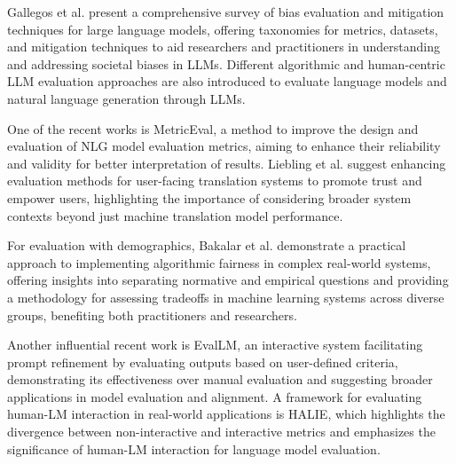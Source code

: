 Gallegos et al.\cite{Wasi2024BengaliBiases} present a comprehensive survey of bias evaluation and mitigation techniques for large language models, offering taxonomies for metrics, datasets, and mitigation techniques to aid researchers and practitioners in understanding and addressing societal biases in LLMs. Different algorithmic and human-centric LLM evaluation approaches are also introduced to evaluate language models and natural language generation through LLMs.

One of the recent works is MetricEval, a method to improve the design and evaluation of NLG model evaluation metrics, aiming to enhance their reliability and validity for better interpretation of results. Liebling et al. suggest enhancing evaluation methods for user-facing translation systems to promote trust and empower users, highlighting the importance of considering broader system contexts beyond just machine translation model performance.

For evaluation with demographics, Bakalar et al. demonstrate a practical approach to implementing algorithmic fairness in complex real-world systems, offering insights into separating normative and empirical questions and providing a methodology for assessing tradeoffs in machine learning systems across diverse groups, benefiting both practitioners and researchers.

Another influential recent work is EvalLM, an interactive system facilitating prompt refinement by evaluating outputs based on user-defined criteria, demonstrating its effectiveness over manual evaluation and suggesting broader applications in model evaluation and alignment. A framework for evaluating human-LM interaction in real-world applications is HALIE, which highlights the divergence between non-interactive and interactive metrics and emphasizes the significance of human-LM interaction for language model evaluation.
